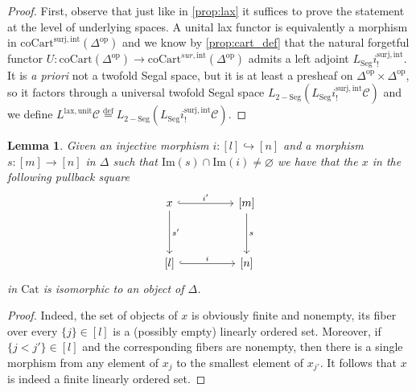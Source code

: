\documentclass[a4paper, reqno]{amsart}
\newtheorem{lemma}[theorem]{Lemma}
\theoremstyle{definition}
\newcommand\cC{\mathscr C}
\newcommand\ima{\mathrm{Im}}
\newcommand\op{\mathrm{op}}
\newcommand\cat{\mathrm{Cat}}
\newcommand\bydef{\overset{\mathrm{def}}{=}}
\newcommand\cart{\mathrm{coCart}}
\newcommand\lax{\mathrm{lax}}
\newcommand\un{\mathrm{unit}}
\newcommand\sur{\mathrm{surj}}
\newcommand\inrt{\mathrm{int}}
\newcommand\seg{\mathrm{Seg}}
\begin{document}
\begin{proof}
First, observe that just like in \cref{prop:lax} it suffices to prove the statement at the level of underlying spaces. A unital lax functor is equivalently a morphism in $\cart^{\sur,\inrt}(\Delta^\op)$ and we know by \cref{prop:cart_def} that the natural forgetful functor $U:\cart(\Delta^\op)\rightarrow\cart^{sur,\inrt}(\Delta^\op)$ admits a left adjoint $L_\seg i^{\sur,\inrt}_!$. It is \textit{a priori} not a twofold Segal space, but it is at least a presheaf on $\Delta^\op\times\Delta^\op$, so it factors through a universal twofold Segal space $L_{\mathrm{2-Seg}}(L_\seg i^{\sur,\inrt}_!\cC)$ and we define $L^{\lax,\un}\cC\bydef L_{\mathrm{2-Seg}}(L_\seg i^{\sur,\inrt}_!\cC)$.
\end{proof}
\begin{lemma}\label{lem:pullback}
Given an injective morphism $i:[l]\hookrightarrow[n]$ and a morphism $s:[m]\rightarrow[n]$ in $\Delta$ such that $\ima(s)\cap\ima(i)\neq\varnothing$ we have that the $x$ in the following pullback square
\[
\begin{tikzcd}[row sep=huge, column sep=huge]
x\arrow[d, "s'"]\arrow[r, hook, "i'"]&{[m]}\arrow[d, "s"]\\
{[l]}\arrow[r, hook, "i"]&{[n]}
\end{tikzcd}
\]
in $\cat$ is isomorphic to an object of $\Delta$.
\end{lemma}
\begin{proof}
Indeed, the set of objects of $x$ is obviously finite and nonempty, its fiber over every $\{j\}\in[l]$ is a (possibly empty) linearly ordered set. Moreover, if $\{j<j'\}\in[l]$ and the corresponding fibers are nonempty, then there is a single morphism from any element of $x_j$ to the smallest element of $x_{j'}$. It follows that $x$ is indeed a finite linearly ordered set.
\end{proof}
\end{document}
